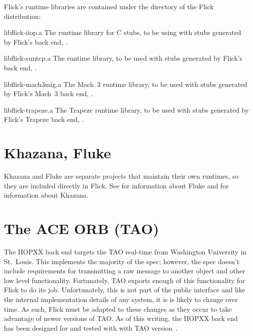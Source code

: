 Flick's runtime libraries are contained under the 
directory of the Flick distribution:

\begin{filenamelist}
  \item[libflick-iiop.a] The \IIOP{} runtime library for C stubs, to be using
  with stubs generated by Flick's \IIOP{} back end, .

  \item[libflick-suntcp.a] The \ONCTCP{} runtime library, to be used with stubs
  generated by Flick's \ONCTCP{} back end, .

  \item[libflick-mach3mig.a] The Mach~3 runtime library, to be used with stubs
  generated by Flick's Mach~3 back end, .

  \item[libflick-trapeze.a] The Trapeze runtime library, to be used with stubs
  generated by Flick's Trapeze back end, .
\end{filenamelist}



\section{Khazana, Fluke}
\label{sec:Runtime:Khazana, Fluke}

Khazana and Fluke are separate projects that maintain their own runtimes, so
they are included directly in Flick.  See \flukeurl{} for information about
Fluke and \khazanaurl{} for information about Khazana.



\section{The ACE ORB (TAO)}
\label{sec:Runtime:TAO}

The IIOPXX back end targets the TAO real-time \ORB{} from Washington University
in St.\ Louis.  This \ORB{} implements the majority of the \CORBA{} spec;
however, the spec doesn't include requirements for transmitting a raw message
to another object and other low level functionality.  Fortunately, TAO exports
enough of this functionality for Flick to do its job.  Unfortunately, this is
not part of the public interface and like the internal implementation details
of any system, it is is likely to change over time.  As such, Flick must be
adapted to these changes as they occur to take advantage of newer versions of
TAO.  As of this writing, the IIOPXX back end has been designed for and tested
with with TAO version~\taoversion{}.






